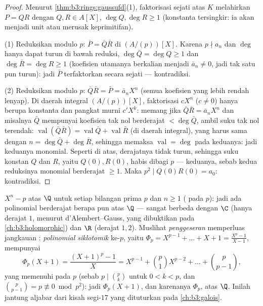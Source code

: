 \begin{proof}
Menurut \cref{thm:b3:rings:gaussufd}(1), faktorisasi sejati atas
$K$ melahirkan $P = QR$ dengan $Q, R \in A[X]$, $\deg Q, \deg R \geq 1$
(konstanta tersingkir: ia akan menjadi unit atau merusak
keprimitifan).

(1) Reduksikan modulo $p$: $\bar P = \bar Q\bar R$ di $(A/(p))[X]$. Karena
$p \nmid a_n$ dan $\deg$ hanya dapat turun di bawah reduksi, $\deg \bar
Q = \deg Q \geq 1$ dan $\deg\bar R = \deg R \geq 1$ (koefisien utamanya
berkalian menjadi $\bar a_n \neq 0$, jadi tak satu pun turun):
jadi $\bar P$ terfaktorkan secara sejati --- kontradiksi.

(2) Reduksikan modulo $p$: $\bar Q \bar R = \bar P = \bar a_n X^n$ (semua
koefisien yang lebih rendah lenyap). Di daerah integral $(A/(p))[X]$,
faktorisasi $cX^n$ ($c \ne 0$) hanya berupa konstanta dan pangkat
murni $c'X^k$: memang jika $\bar Q\bar R = \bar a_nX^n$ dan misalnya
$\bar Q$ mempunyai koefisien tak nol berderajat $< \deg\bar Q$, ambil
suku tak nol terendah: $\operatorname{val}(\bar Q\bar R) =
\operatorname{val}\bar Q + \operatorname{val}\bar R$ (di daerah integral),
yang harus sama dengan $n = \deg\bar Q + \deg\bar R$, sehingga memaksa
$\operatorname{val} = \deg$ pada keduanya: jadi keduanya monomial. Seperti
di atas, derajatnya tidak turun, sehingga suku konstan $Q$ dan $R$,
yaitu $Q(0), R(0)$, habis dibagi $p$ --- keduanya, sebab kedua
reduksinya monomial berderajat $\geq 1$. Maka $p^2 \mid
Q(0)R(0) = a_0$: kontradiksi.
\end{proof}

\begin{example}\label{ex:b3:rings:eisenstein}
$X^n - p$  atas $\Q$ untuk setiap bilangan prima $p$ dan $n
\geq 1$ ( pada $p$): jadi ada polinomial 
berderajat berapa pun atas $\Q$ --- sangat berbeda dengan $\C$ (hanya derajat
$1$, menurut d'Alembert--Gauss, yang dibuktikan pada \cref{ch:b3:holomorphic}) dan
$\R$ (derajat $1, 2$). Muslihat \emph{penggeseran} memperluas
jangkauan : \emph{polinomial siklotomik} ke-$p$, yaitu $\Phi_p = X^{p-1} +
\dots + X + 1 = \frac{X^p - 1}{X - 1}$, mempunyai
\[
\Phi_p(X + 1) = \frac{(X+1)^p - 1}{X}
= X^{p-1} + \binom{p}{1}X^{p-2} + \dots + \binom{p}{p-1},
\]
yang memenuhi  pada $p$ (sebab $p \mid \binom pk$ untuk $0 < k < p$, dan
$\binom{p}{p-1} = p \not\equiv 0 \bmod p^2$): jadi $\Phi_p(X+1)$, dan karenanya
$\Phi_p$,  atas $\Q$. Inilah jantung aljabar dari
kisah segi-$17$ yang dituturkan pada \cref{ch:b3:galois}.
\end{example}

